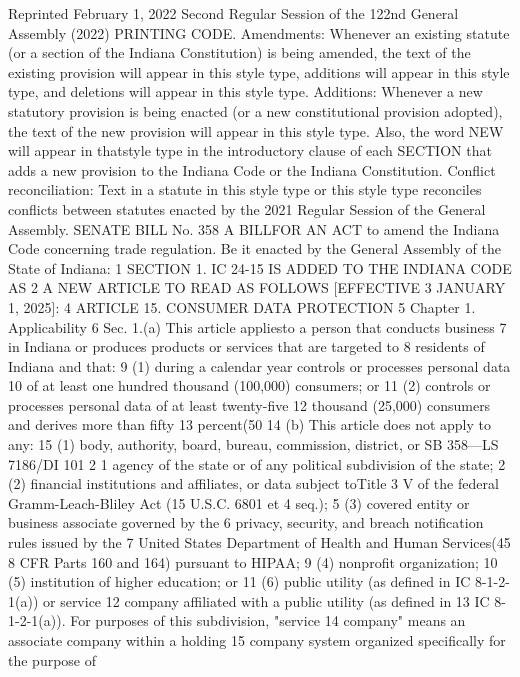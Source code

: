 Reprinted
February 1, 2022
Second Regular Session of the 122nd General Assembly (2022)
PRINTING CODE. Amendments: Whenever an existing statute (or a section of the Indiana
Constitution) is being amended, the text of the existing provision will appear in this style type,
additions will appear in this style type, and deletions will appear in this style type.
Additions: Whenever a new statutory provision is being enacted (or a new constitutional
provision adopted), the text of the new provision will appear in this style type. Also, the
word NEW will appear in thatstyle type in the introductory clause of each SECTION that adds
a new provision to the Indiana Code or the Indiana Constitution.
Conflict reconciliation: Text in a statute in this style type or this style type reconciles conflicts
between statutes enacted by the 2021 Regular Session of the General Assembly.
SENATE BILL No. 358
A BILLFOR AN ACT to amend the Indiana Code concerning trade
regulation.
Be it enacted by the General Assembly of the State of Indiana:
1 SECTION 1. IC 24-15 IS ADDED TO THE INDIANA CODE AS
2 A NEW ARTICLE TO READ AS FOLLOWS [EFFECTIVE
3 JANUARY 1, 2025]:
4 ARTICLE 15. CONSUMER DATA PROTECTION
5 Chapter 1. Applicability
6 Sec. 1.(a) This article appliesto a person that conducts business
7 in Indiana or produces products or services that are targeted to
8 residents of Indiana and that:
9 (1) during a calendar year controls or processes personal data
10 of at least one hundred thousand (100,000) consumers; or
11 (2) controls or processes personal data of at least twenty-five
12 thousand (25,000) consumers and derives more than fifty
13 percent(50%
14 (b) This article does not apply to any:
15 (1) body, authority, board, bureau, commission, district, or
SB 358—LS 7186/DI 101
2
1 agency of the state or of any political subdivision of the state;
2 (2) financial institutions and affiliates, or data subject toTitle
3 V of the federal Gramm-Leach-Bliley Act (15 U.S.C. 6801 et
4 seq.);
5 (3) covered entity or business associate governed by the
6 privacy, security, and breach notification rules issued by the
7 United States Department of Health and Human Services(45
8 CFR Parts 160 and 164) pursuant to HIPAA;
9 (4) nonprofit organization;
10 (5) institution of higher education; or
11 (6) public utility (as defined in IC 8-1-2-1(a)) or service
12 company affiliated with a public utility (as defined in
13 IC 8-1-2-1(a)). For purposes of this subdivision, "service
14 company" means an associate company within a holding
15 company system organized specifically for the purpose of

